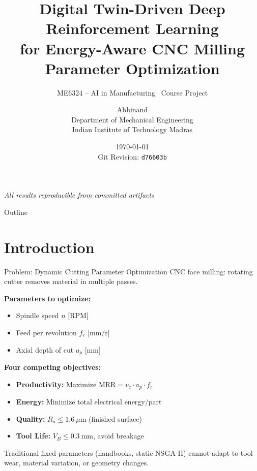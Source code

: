 \documentclass[11pt,aspectratio=169]{beamer}
\title[Digital Twin DRL for CNC Milling]{Digital Twin-Driven Deep Reinforcement Learning\\for Energy-Aware CNC Milling Parameter Optimization}
\subtitle{ME6324 -- AI in Manufacturing \textbar\ Course Project}
\author{Abhinand \\ Department of Mechanical Engineering \\ Indian Institute of Technology Madras}
\institute{IIT Madras}
\date{\today \\ Git Revision: \texttt{d76603b}}
\newcommand{\MRR}{\mathrm{MRR}}
\newcommand{\Ra}{R_a}
\newcommand{\VB}{V_B}
\begin{document}
\begin{frame}
    \titlepage
    \vfill
    \centering
    \small \textit{All results reproducible from committed artifacts}
\end{frame}

\begin{frame}{Outline}
    \tableofcontents
\end{frame}

\section{Introduction}

\begin{frame}{Problem: Dynamic Cutting Parameter Optimization}
    CNC face milling: rotating cutter removes material in multiple passes.
    \vspace{0.5em}

    \textbf{Parameters to optimize:}
    \begin{itemize}
        \item Spindle speed $n$ [RPM]
        \item Feed per revolution $f_r$ [mm/r]
        \item Axial depth of cut $a_p$ [mm]
    \end{itemize}

    \vspace{0.5em}
    \textbf{Four competing objectives:}
    \begin{itemize}
        \item \textbf{Productivity:} Maximize $\MRR = v_c \cdot a_p \cdot f_r$
        \item \textbf{Energy:} Minimize total electrical energy/part
        \item \textbf{Quality:} $\Ra \le 1.6\ \mu\text{m}$ (finished surface)
        \item \textbf{Tool Life:} $\VB \le 0.3\ \text{mm}$, avoid breakage
    \end{itemize}

    \vspace{0.5em}
    \alert{Traditional fixed parameters (handbooks, static NSGA-II) cannot adapt to tool wear, material variation, or geometry changes.}
\end{frame}
\end{document}
